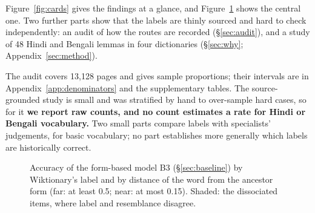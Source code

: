 \documentclass[11pt]{article}
\begin{document}
Figure~\ref{fig:cards} gives the findings at a glance, and Figure~\ref{fig:grid} shows the central one. Two further parts show that the labels are thinly sourced and hard to check independently: an audit of how the routes are recorded (\S\ref{sec:audit}), and a study of 48 Hindi and Bengali lemmas in four dictionaries (\S\ref{sec:why}; Appendix~\ref{sec:method}).

The audit covers 13,128 pages and gives sample proportions; their intervals are in Appendix~\ref{app:denominators} and the supplementary tables. The source-grounded study is small and was stratified by hand to over-sample hard cases, so for it \textbf{we report raw counts, and no count estimates a rate for Hindi or Bengali vocabulary.} Two small parts compare labels with specialists' judgements, for basic vocabulary; no part establishes more generally which labels are historically correct.

\begin{figure}[t]
\centering
{}
\caption{Accuracy of the form-based model B3 (\S\ref{sec:baseline}) by Wiktionary's label and by distance of the word from the ancestor form (far: at least 0.5; near: at most 0.15). Shaded: the dissociated items, where label and resemblance disagree.}
\label{fig:grid}
\end{figure}
\end{document}
